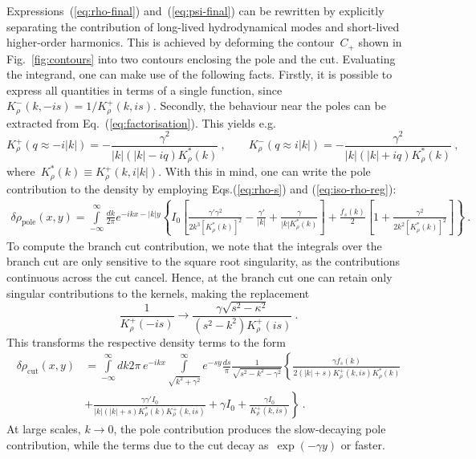 \documentclass[preprint,aps,eqsecnum, prb]{revtex4-1}
\newcommand{\fplus}[1]{{#1}^{+}}
\newcommand{\fminus}[1]{{#1}^{-}}
\begin{document}
Expressions~(\ref{eq:rho-final}) and~(\ref{eq:psi-final}) can be
rewritten by explicitly separating the contribution of long-lived
hydrodynamical modes and short-lived higher-order harmonics. This
is achieved by deforming the contour~$C_{+}$ shown in Fig.~\ref{fig:contours}
into two contours enclosing the pole and the cut. Evaluating
the integrand, one can make use of the following facts.
Firstly,
it is possible to express all quantities in terms of a single function,
since~$\fminus{K}_\rho(k, -is) = 1/\fplus{K}_\rho(k, is)$.  Secondly,
the behaviour near the poles can be extracted from
Eq.~(\ref{eq:factorisation}). This yields e.g. \begin{equation}
 \fplus{K}_\rho (q \approx -i |k|)
 = - \frac{\gamma^2}{|k|(|k| - i q) K_\rho^\ast(k)}
 \ ,
 \qquad
 \fminus{K}_{\rho}(q \approx i |k|) = - \frac{\gamma^2}{|k|(|k| + iq)
   K_\rho^\ast(k)}
 \ ,
\end{equation}
where~$K_\rho^\ast(k) \equiv \fplus{K}_\rho(k, i|k|)$.
With this in mind, one can write the pole contribution
to the density by employing Eqs.(\ref{eq:rho-s}) and (\ref{eq:iso-rho-reg}):
\begin{align}
\delta \rho_\mathrm{pole}(x, y)
= \int\limits_{-\infty}^{\infty}\frac{dk}{2\pi} e^{-ikx - |k| y}
\left\{I_0 \left[
\frac{\gamma'\gamma^2}{2k^3 \left[K_\rho^\ast(k)\right]^2}
- \frac{\gamma'}{|k|}
+ \frac{\gamma}{|k| K_\rho^\ast(k)}\right]
+ \frac{f_s(k)}{2} \left[1 + \frac{\gamma^2}{2 k^2                            \left[K_\rho^\ast(k)\right]^2} \right]
\right\} \ .
\end{align}
To compute the branch cut contribution,  we note that
the  integrals over the branch cut are only sensitive
to the square root singularity, as the contributions continuous
across the cut cancel.
Hence, at the branch cut one can retain only singular contributions
to the kernels, making the replacement
\begin{equation}
 \frac{1}{\fplus{K}_\rho (-is)} \to
  \frac{\gamma\sqrt{s^2 - \kappa^2}}{(s^2 - k^2) \fplus{K}_\rho(is)}
 \ .
\end{equation}
This transforms the respective density terms to the form
\begin{align}
\delta\rho_\mathrm{cut}(x, y) &= \int\limits_{-\infty}^{\infty}{dk}{2\pi}
\, e^{-ikx}
\int\limits_{\sqrt{k^2 + \gamma^2}}^{\infty} e^{-sy}\frac{ds}{\pi}
\frac{1}{\sqrt{s^2 - k^2 - \gamma^2}}
\left\{
\frac{\gamma f_s(k)}{2(|k| + s)\fplus{K}_\rho(k, is) K_\rho^\ast(k)}
\right. \\ \nonumber
&+ \left. \frac{\gamma\gamma' I_0}{|k|(|k| + s) K_\rho^\ast(k)
\fplus{K}_\rho(k, is)} + \gamma I_0
+ \frac{\gamma I_0}{\fplus{K}_\rho(k, is)} \right\}  \ .
\end{align}
At large scales, $k\to 0$, the pole contribution produces
the slow-decaying pole contribution, while  the terms due
to the cut decay as~$\exp(-\gamma y)$ or faster.
\end{document}
